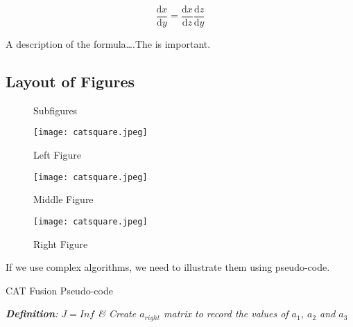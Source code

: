 \[\frac{\text{d}x}{\text{d}y}=\frac{\text{d}x}{\text{d}z}\frac{\text{d}z}{\text{d}y}\]

A description of the formula\dots.The  is important.
\subsection{Layout of Figures}
\begin{figure}[H]
    \centering   %
	\caption{Subfigures} %
\end{figure}
\vspace{-0.5cm}

\begin{figure}[H] %
	\centering
		\begin{minipage}[t]{0.3\linewidth} %
			\centering
			\texttt{[image: catsquare.jpeg]}
            \captionsetup{justification=centering} \caption{Left Figure}
		\end{minipage}%
		\begin{minipage}[t]{0.3\linewidth}
			\centering
			\texttt{[image: catsquare.jpeg]}
			\captionsetup{justification=centering} \caption{Middle Figure}
		\end{minipage}%
        \begin{minipage}[t]{0.3\linewidth}
			\centering
			\texttt{[image: catsquare.jpeg]}
			\captionsetup{justification=centering} \caption{Right Figure}
		\end{minipage}%
    \vspace{-0.5cm}
\end{figure}


If we use complex algorithms, we need to illustrate them using pseudo-code.

\begin{algorithm}[H]
    \caption{CAT Fusion Pseudo-code}
    \SetAlgoLined
    \emph{\textbf{Definition}: $J=Inf$  \& Create $a_{right}$ matrix to record the values of $a_1$, $a_2$ and $a_3$}\;
  \end{algorithm}
\vspace{-0.5cm}

